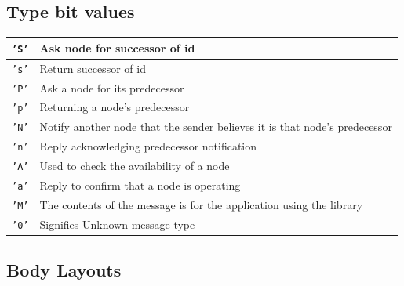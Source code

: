 \documentclass{article}
\begin{document}
\subsection{Type bit values}
\begin{tabular}{|l | l|}
\hline
\texttt{'S'} & Ask node for successor of id \\\hline
\texttt{'s'} & Return successor of id \\\hline
\texttt{'P'} & Ask a node for its predecessor \\\hline
\texttt{'p'} & Returning a node's predecessor \\\hline
\texttt{'N'} & Notify another node that the sender believes it is that node's predecessor \\\hline
\texttt{'n'} & Reply acknowledging predecessor notification \\\hline
\texttt{'A'} & Used to check the availability of a node\\\hline
\texttt{'a'} & Reply to confirm that a node is operating \\\hline
\texttt{'M'} & The contents of the message is for the application using the library \\\hline
\texttt{'0'} & Signifies Unknown message type \\\hline
\end{tabular}

\subsection{Body Layouts}
\end{document}
